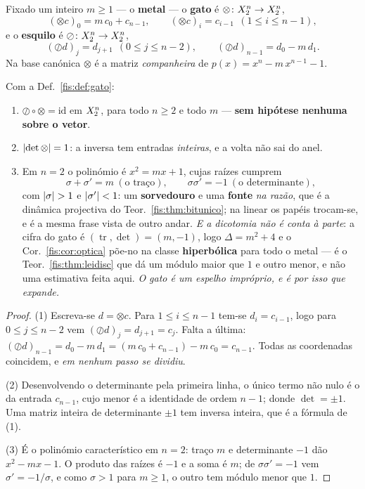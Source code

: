\documentclass[livro.tex]{subfiles}
\begin{document}
\begin{definicao}\label{fis:def:gato}
Fixado um inteiro $m\ge1$ --- o \textbf{metal} --- o \textbf{gato} é
$\otimes\colon X_2^{n}\to X_2^{n}$,
\[
(\otimes c)_0=m\,c_0+c_{n-1},\qquad (\otimes c)_i=c_{i-1}\ \ (1\le i\le n-1),
\]
e o \textbf{esquilo} é $\oslash\colon X_2^{n}\to X_2^{n}$,
\[
(\oslash d)_j=d_{j+1}\ \ (0\le j\le n-2),\qquad
(\oslash d)_{n-1}=d_0-m\,d_1 .
\]
Na base canónica $\otimes$ é a matriz \emph{companheira} de
$p(x)=x^{n}-m\,x^{n-1}-1$.
\end{definicao}

\begin{teorema}\label{fis:thm:gato}
Com a Def.~\ref{fis:def:gato}:
\begin{enumerate}\itemsep3pt
\item[(1)] $\oslash\circ\otimes=\mathrm{id}$ em $X_2^{n}$, para todo $n\ge2$ e
todo $m$ --- \textbf{sem hipótese nenhuma sobre o vetor}.
\item[(2)] $\lvert \det\otimes\rvert=1$: a inversa tem entradas \emph{inteiras}, e a
volta não sai do anel.
\item[(3)] Em $n=2$ o polinómio é $x^{2}=mx+1$, cujas raízes cumprem
\[
\sigma+\sigma'=m\ (\text{o traço}),\qquad \sigma\sigma'=-1\ (\text{o determinante}),
\]
com $\lvert \sigma\rvert>1$ e $\lvert \sigma'\rvert<1$: um \textbf{sorvedouro} e uma
\textbf{fonte} \emph{na razão}, que é a dinâmica projectiva do
Teor.~\ref{fis:thm:bitunico}; na linear os papéis trocam-se, e é a mesma frase
vista de outro andar. \emph{E a dicotomia não é conta à parte}: a cifra do gato é
$(\operatorname{tr},\det)=(m,-1)$, logo $\Delta=m^{2}+4$ e o
Cor.~\ref{fis:cor:optica} põe-no na classe \textbf{hiperbólica} para todo o
metal --- é o Teor.~\ref{fis:thm:leidisc} que dá um módulo maior que $1$ e outro
menor, e não uma estimativa feita aqui. \emph{O gato é um espelho impróprio, e é
por isso que expande.}\end{enumerate}
\end{teorema}

\begin{proof}
(1) Escreva-se $d=\otimes c$. Para $1\le i\le n-1$ tem-se $d_i=c_{i-1}$, logo
para $0\le j\le n-2$ vem $(\oslash d)_j=d_{j+1}=c_j$. Falta a última:
$(\oslash d)_{n-1}=d_0-m\,d_1=(m\,c_0+c_{n-1})-m\,c_0=c_{n-1}$. Todas as
coordenadas coincidem, e \emph{em nenhum passo se dividiu}.

(2) Desenvolvendo o determinante pela primeira linha, o único termo não nulo é o
da entrada $c_{n-1}$, cujo menor é a identidade de ordem $n-1$; donde
$\det=\pm1$. Uma matriz inteira de determinante $\pm1$ tem inversa inteira, que é
a fórmula de (1).

(3) É o polinómio característico em $n=2$: traço $m$ e determinante $-1$ dão
$x^{2}-mx-1$. O produto das raízes é $-1$ e a soma é $m$; de $\sigma\sigma'=-1$
vem $\sigma'=-1/\sigma$, e como $\sigma>1$ para $m\ge1$, o outro tem módulo menor
que $1$.
\end{proof}
\end{document}
